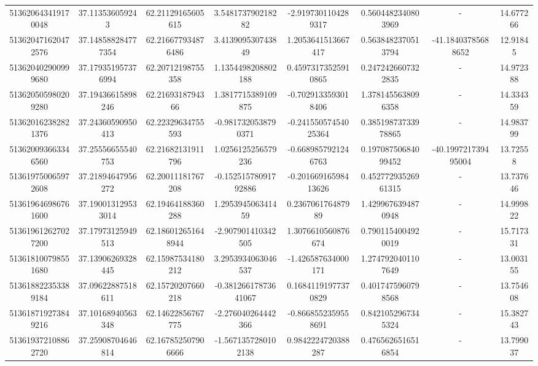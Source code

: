 \documentclass{article}
\begin{document}
\begin{landscape}
\begin{longtable}[c]{S[table-format=18.0]S[table-format=2.15]S[table-format=2.15]S[table-format=-2.17]S[table-format=-2.16]S[table-format=-2.16]S[table-format=-3.16]S[table-format=2.7]}
513620643419170048 & 37.113536059243    & 62.21129165605615  & 3.548173790218282     & -2.9197301104289317   & 0.5604482340803969  & {-}                  & 14.677266  \\
513620471620472576 & 37.148588284777354 & 62.216677934876486 & 3.413909530743849     & 1.2053641513667417    & 0.5638482370513794  & -41.18403785688652  & 12.91845   \\
513620402900999680 & 37.179351957376994 & 62.20712198755358  & 1.1354498208802188    & 0.45973173525910865   & 0.2472426607322835  & {-}                  & 14.972388  \\
513620505980209280 & 37.19436615898246  & 62.2169318794366   & 1.3817715389109875    & -0.7029133593018406   & 1.3781455638096358  & {-}                  & 14.334359  \\
513620162382821376 & 37.24360590950413  & 62.22329634755593  & -0.9817320538790371   & -0.24155057454025364  & 0.38519873733978865 & {-}                  & 14.983799  \\
513620093663346560 & 37.25556655540753  & 62.21682131911796  & 1.0256125256579236    & -0.6689857921246763   & 0.19708750684099452 & -40.199721739495004 & 13.72558   \\
513619750065972608 & 37.21894647956272  & 62.20011181767208  & -0.15251578091792886  & -0.20166916598413626  & 0.45277293526961315 & {-}                  & 13.737646  \\
513619646986761600 & 37.190013129533014 & 62.19464188360288  & 1.295394506341459     & 0.236706176487989     & 1.4299676394870948  & {-}                  & 14.999822  \\
513619612627027200 & 37.17973125949513  & 62.186012651648944 & -2.907901410342505    & 1.3076610560876674    & 0.7901154004920019  & {-}                  & 15.717331  \\
513618100798551680 & 37.13906269328445  & 62.15987534180212  & 3.2953934063046537    & -1.426587634000171    & 1.2747920401107649  & {-}                  & 13.003155  \\
513618822353389184 & 37.09622887518611  & 62.15720207660218  & -0.38126617873641067  & 0.16841191977370829   & 0.4017475960798568  & {-}                  & 13.754608  \\
513618719273849216 & 37.10168940563348  & 62.14622856767775  & -2.276040264442366    & -0.8668552359558691   & 0.8421052967345324  & {-}                  & 15.382743  \\
513619372108862720 & 37.25908704646814  & 62.167852507906666 & -1.5671357280102138   & 0.9842224720388287    & 0.4765626516516854  & {-}                  & 13.799037  \\

\end{longtable}
\end{landscape}
\end{document}
